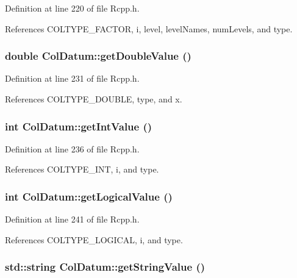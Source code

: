 Definition at line 220 of file Rcpp.h.

References COLTYPE\_\-FACTOR, i, level, levelNames, numLevels, and type.\hypertarget{classColDatum_6a19044be8ade2b14b372b179210a9bd}{
\subsubsection[getDoubleValue]{\setlength{\rightskip}{0pt plus 5cm}double ColDatum::getDoubleValue ()}}
\label{classColDatum_6a19044be8ade2b14b372b179210a9bd}




Definition at line 231 of file Rcpp.h.

References COLTYPE\_\-DOUBLE, type, and x.\hypertarget{classColDatum_f498266608526c9db7f865bc66cc5e40}{
\subsubsection[getIntValue]{\setlength{\rightskip}{0pt plus 5cm}int ColDatum::getIntValue ()}}
\label{classColDatum_f498266608526c9db7f865bc66cc5e40}




Definition at line 236 of file Rcpp.h.

References COLTYPE\_\-INT, i, and type.\hypertarget{classColDatum_df81b2aed6f8e19b6f36310288991f38}{
\subsubsection[getLogicalValue]{\setlength{\rightskip}{0pt plus 5cm}int ColDatum::getLogicalValue ()}}
\label{classColDatum_df81b2aed6f8e19b6f36310288991f38}




Definition at line 241 of file Rcpp.h.

References COLTYPE\_\-LOGICAL, i, and type.\hypertarget{classColDatum_d0d76d861441151f31cf42acff4b8c0f}{
\subsubsection[getStringValue]{\setlength{\rightskip}{0pt plus 5cm}std::string ColDatum::getStringValue ()}}
\label{classColDatum_d0d76d861441151f31cf42acff4b8c0f}




